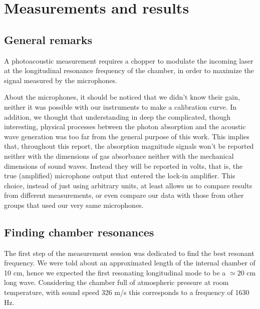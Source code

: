 \chapter{Measurements and results}\label{chapter3}
\section{General remarks}
A photoacoustic measurement requires a chopper to modulate the incoming laser at the longitudinal resonance frequency of the chamber, in order to maximize the signal measured by the microphones.

About the microphones, it should be noticed that we didn't know their gain, neither it was possible with our instruments to make a calibration curve. In addition, we thought that understanding in deep the complicated, though interesting, physical processes between the photon absorption and the acoustic wave generation was too far from the general purpose of this work. This implies that, throughout this report, the absorption magnitude signals won't be reported neither with the dimensions of gas absorbance neither with the mechanical dimensions of sound waves. Instead they will be reported in volts, that is, the true (amplified) microphone output that entered the lock-in amplifier. This choice, instead of just using arbitrary units, at least allows us to compare results from different measurements, or even compare our data with those from other groups that used our very same microphones.

\section{Finding chamber resonances}\label{chamber}
The first step of the measurement session was dedicated to find the best resonant frequency. We were told about an approximated length of the internal chamber of 10 cm, hence we expected the first resonating longitudinal mode to be a $\simeq20$ cm long wave. Considering the chamber full of atmospheric pressure  at room temperature, with sound speed 326 m/s this corresponds to a frequency of 1630 Hz.

